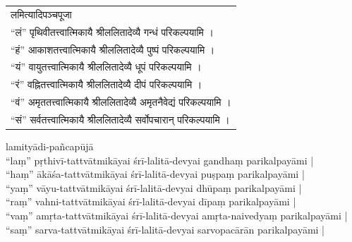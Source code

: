 \chapter*{}

\begin{sloka}
{\sanskritfont
\begin{tabular}{l}
लमित्यादिपञ्चपूजा \\
``लं'' पृथिवीतत्त्वात्मिकायै श्रीललितादेव्यै गन्धं परिकल्पयामि ।\\
``हं'' आकाशतत्त्वात्मिकायै श्रीललितादेव्यै पुष्पं परिकल्पयामि ।\\
``यं'' वायुतत्त्वात्मिकायै श्रीललितादेव्यै धूपं परिकल्पयामि ।\\
``रं'' वह्नितत्त्वात्मिकायै श्रीललितादेव्यै दीपं परिकल्पयामि ।\\
``वं'' अमृततत्त्वात्मिकायै श्रीललितादेव्यै अमृतनैवेद्यं परिकल्पयामि ।\\
``सं'' सर्वतत्त्वात्मिकायै श्रीललितादेव्यै सर्वोपचारान् परिकल्पयामि ।
\end{tabular}
}
\end{sloka}

\vspace{1em}

{\scriptsize \iastfont
lamityādi-pañcapūjā\\
``laṃ'' pṛthivī-tattvātmikāyai śrī-lalitā-devyai gandhaṃ parikalpayāmi |\\
``haṃ'' ākāśa-tattvātmikāyai śrī-lalitā-devyai puṣpaṃ parikalpayāmi |\\
``yaṃ'' vāyu-tattvātmikāyai śrī-lalitā-devyai dhūpaṃ parikalpayāmi |\\
``raṃ'' vahni-tattvātmikāyai śrī-lalitā-devyai dīpaṃ parikalpayāmi |\\
``vaṃ'' amṛta-tattvātmikāyai śrī-lalitā-devyai amṛta-naivedyaṃ parikalpayāmi |\\
``saṃ'' sarva-tattvātmikāyai śrī-lalitā-devyai sarvopacārān parikalpayāmi |
}

\vspace{1em}

{\scriptsize
{}
}


